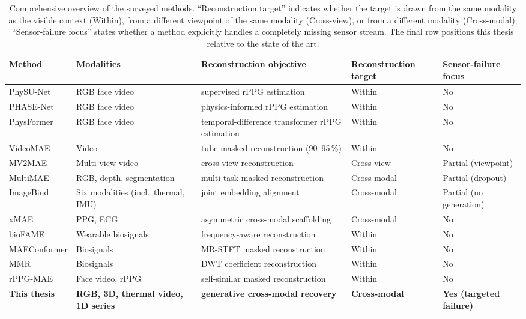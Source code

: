 \begin{table}[htbp]
\centering
\small
\setlength{\tabcolsep}{5pt}
\caption{Comprehensive overview of the surveyed methods. \enquote{Reconstruction
target} indicates whether the target is drawn from the same modality as the
visible context (Within), from a different viewpoint of the same modality
(Cross-view), or from a different modality (Cross-modal); \enquote{Sensor-failure
focus} states whether a method explicitly handles a completely missing sensor
stream. The final row positions this thesis relative to the state of the art.}
\label{tab:rw-overview}
\begin{tabular}{@{}p{3.2cm} p{2.5cm} p{4.3cm} p{2.2cm} p{2.4cm}@{}}
\toprule
Method & Modalities & Reconstruction objective & Reconstruction target & Sensor-failure focus \\
\midrule
PhySU-Net \cite{savic2024physunet}
    & RGB face video & supervised rPPG estimation & Within & No \\
PHASE-Net \cite{zhao2025phasenet}
    & RGB face video & physics-informed rPPG estimation & Within & No \\
PhysFormer \cite{yu2022physformerfacialvideobasedphysiological}
    & RGB face video & temporal-difference transformer rPPG estimation & Within & No \\

VideoMAE \cite{tong2022videomae}
    & Video & tube-masked reconstruction (90--95\,\%) & Within & No \\

MV2MAE \cite{shah2024mv2mae}
    & Multi-view video & cross-view reconstruction & Cross-view & Partial \newline (viewpoint) \\
MultiMAE \cite{bachmann2022multimae}
    & RGB, depth, segmentation & multi-task masked reconstruction & Cross-modal & Partial \newline (dropout) \\
ImageBind \cite{girdhar2023imagebind}
    & Six modalities (incl.\ thermal, IMU) & joint embedding alignment & Cross-modal & Partial \newline (no generation) \\
xMAE \cite{zhou2026xmae}
    & PPG, ECG & asymmetric cross-modal scaffolding & Cross-modal & No \\
bioFAME \cite{liu2024biofame}
    & Wearable biosignals & frequency-aware reconstruction & Within & No \\
MAEConformer \cite{yu2026maeconformer}
    & Biosignals & MR-STFT masked reconstruction & Within & No \\
MMR \cite{thukral2026wavelet}
    & Biosignals & DWT coefficient reconstruction & Within & No \\
rPPG-MAE \cite{liu2023rppgmae}
    & Face video, rPPG & self-similar masked reconstruction & Within & No \\
\midrule
\textbf{This thesis}
    & \textbf{RGB, 3D, thermal video, 1D series}
    & \textbf{generative cross-modal recovery}
    & \textbf{Cross-modal} & \textbf{Yes (targeted failure)} \\
\bottomrule
\end{tabular}
\end{table}

